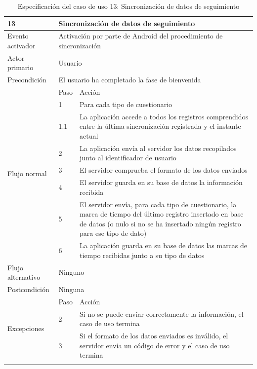     \begin{table}[h]
        \centering
        \begin{tabularx}{\textwidth}{|l|l|X|}
            \hline
            13 & \multicolumn{2}{|X|}{Sincronización de datos de seguimiento} \\
            \hline
            Evento activador & \multicolumn{2}{|X|}{Activación por parte de Android del procedimiento de sincronización} \\
            \hline
            Actor primario & \multicolumn{2}{|X|}{Usuario} \\
            \hline
            Precondición & \multicolumn{2}{|X|}{El usuario ha completado la fase de bienvenida} \\
            \hline
            \multirow{8}{*}{Flujo normal} & Paso & Acción \\
            \cline{2-3} & 1 & Para cada tipo de cuestionario \\
            \cline{2-3} & 1.1 & La aplicación accede a todos los registros comprendidos entre la última sincronización registrada y el instante actual \\
            \cline{2-3} & 2 & La aplicación envía al servidor los datos recopilados junto al identificador de usuario \\
            \cline{2-3} & 3 & El servidor comprueba el formato de los datos enviados \\
            \cline{2-3} & 4 & El servidor guarda en su base de datos la información recibida \\
            \cline{2-3} & 5 & El servidor envía, para cada tipo de cuestionario, la marca de tiempo del último registro insertado en base de datos (o nulo si no se ha insertado ningún registro para ese tipo de dato) \\
            \cline{2-3} & 6 & La aplicación guarda en su base de datos las marcas de tiempo recibidas junto a su tipo de datos \\
            \hline
            Flujo alternativo & \multicolumn{2}{|X|}{Ninguno} \\
            \hline
            Postcondición & \multicolumn{2}{|X|}{Ninguna} \\
            \hline
            \multirow{3}{*}{Excepciones}  & Paso & Acción \\
            \cline{2-3} & 2 & Si no se puede enviar correctamente la información, el caso de uso termina \\
            \cline{2-3} & 3 & Si el formato de los datos enviados es inválido, el servidor envía un código de error y el caso de uso termina \\
            \hline
            \caption{Especificación del caso de uso 13: Sincronización de datos de seguimiento}
            \label{tabla:casos_uso:sincronizacion_seguimiento}
        \end{tabularx}
    \end{table}

